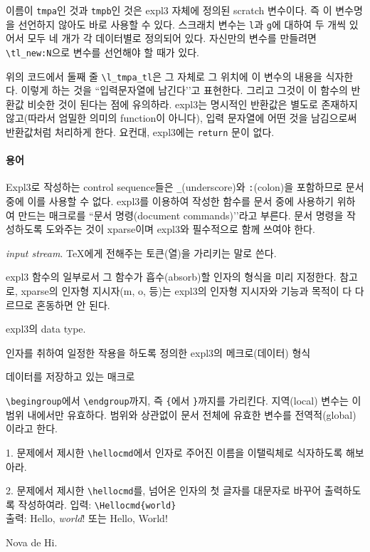 \documentclass[a4paper,amsmath,itemph]{oblivoir}
\newcommand\pkg[1]{\textsf{#1}}
\begin{document}
이름이 \verb|tmpa|인 것과 \verb|tmpb|인 것은 expl3 자체에 정의된 scratch 변수이다. 즉 이 변수명을 선언하지 않아도 바로 사용할 수 있다. 스크래치 변수는 \verb|l|과 \verb|g|에 대하여 두 개씩 있어서 모두 네 개가 각 데이터별로 정의되어 있다.
자신만의 변수를 만들려면 \verb|\tl_new:N|으로 변수를 선언해야 할 때가 있다.

위의 코드에서 둘째 줄 \verb|\l_tmpa_tl|은 그 자체로 그 위치에 이 변수의 내용을 식자한다. 이렇게 하는 것을 ``입력문자열에 남긴다’’고 표현한다. 그리고 그것이 이 함수의 반환값 비슷한 것이 된다는 점에 유의하라. expl3는 명시적인 반환값은 별도로 존재하지 않고(따라서 엄밀한 의미의 function이 아니다), 입력 문자열에 어떤 것을 남김으로써 반환값처럼 처리하게 한다. 요컨대, expl3에는 \verb|return| 문이 없다.


\paragraph{용어}

\begin{description}\firmlist
\item[문서 명령] Expl3로 작성하는 control sequence들은 \verb|_|(underscore)와 \verb|:|(colon)을 포함하므로 문서 중에 이를 사용할 수 없다. expl3를 이용하여 작성한 함수를 문서 중에 사용하기 위하여 만드는 매크로를 ``문서 명령(document commands)’’라고 부른다. 문서 명령을 작성하도록 도와주는 것이 \pkg{xparse}이며 expl3와 필수적으로 함께 쓰여야 한다.
\item[입력 문자열] \emph{input stream}. \TeX 에게 전해주는 토큰(열)을 가리키는 말로 쓴다.
\item[인자형 지시자] expl3 함수의 일부로서 그 함수가 흡수(absorb)할 인자의 형식을 미리 지정한다. 참고로, \pkg{xparse}의 인자형 지시자(m, o, 등)는 expl3의 인자형 지시자와 기능과 목적이 다 다르므로 혼동하면 안 된다.
\item[자료형] expl3의 data type.
\item[함수] 인자를 취하여 일정한 작용을 하도록 정의한 expl3의 메크로(데이터) 형식
\item[변수] 데이터를 저장하고 있는 매크로
\item[범위] \verb|\begingroup|에서 \verb|\endgroup|까지, 즉 \verb|{|에서 \verb|}|까지를 가리킨다. 지역(local) 변수는 이 범위 내에서만 유효하다. 범위와 상관없이 문서 전체에 유효한 변수를 전역적(global)이라고 한다.
\end{description}


\vfill

\begin{tcolorbox}[title={연습문제},fonttitle=\sffamily]
 1. 문제에서 제시한 \verb|\hellocmd|에서 인자로 주어진 이름을 이탤릭체로 식자하도록 해보아라.

\bigskip

 2. 문제에서 제시한 \verb|\hellocmd|를, 넘어온 인자의 첫 글자를 대문자로 바꾸어 출력하도록 작성하여라.
\tcblower
입력: \verb|\Hellocmd{world}|\\
출력: Hello, \textit{world}! 또는 Hello, World!
\end{tcolorbox}

\vfill

\hfill Nova de Hi.
\end{document}
